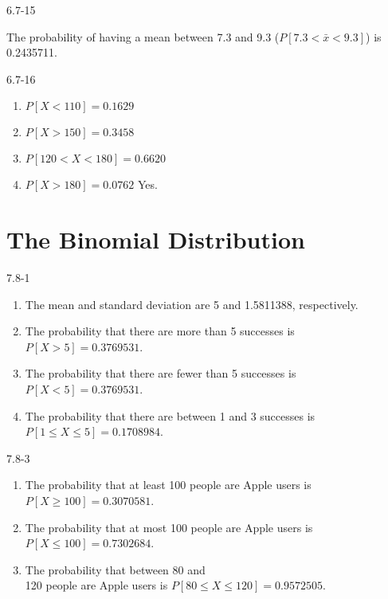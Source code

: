 \begin{exsol@solution}{6.7-15}


    The probability of having a mean between 7.3 and  9.3 ($P[ 7.3 < \bar{x} < 9.3 ]$) is 0.2435711.

\end{exsol@solution}
\begin{exsol@solution}{6.7-16}
\begin{enumerate}
\item $P[ X < 110 ] = 0.1629 $
\item $P[ X > 150 ] = 0.3458 $
\item $P[ 120 < X < 180 ] = 0.6620 $
\item $P[ X > 180 ] = 0.0762 $ Yes.
\end{enumerate}

\end{exsol@solution}
\setcounter{chapter}{6}\chapter{The Binomial Distribution}
\begin{exsol@solution}{7.8-1}

		\begin{enumerate}
	  \item The mean and standard deviation are 5 and 1.5811388, respectively.
    \item The probability that there are more than 5 successes is $P[ X > 5 ] = 0.3769531$.
    \item The probability that there are fewer than 5 successes is $P[ X < 5 ] = 0.3769531$.
    \item The probability that there  are between 1 and 3 successes  is $P[ 1 \le X \le 5 ] = 0.1708984$.
	  \end{enumerate}
\end{exsol@solution}
\begin{exsol@solution}{7.8-3}

\begin{enumerate}
\item The probability that at least 100 people are Apple users is $P[X \ge 100] = 0.3070581$.
\item The probability that at most 100 people are Apple users is $P[X \le 100] = 0.7302684$.
\item The probability that between 80 and \\ 120 people are Apple users is $P[ 80 \le X \le 120] = 0.9572505$.
\end{enumerate}
\end{exsol@solution}
